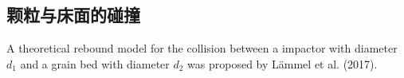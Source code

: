 \documentclass[12pt,a4paper]{article}
\newcommand{\diff}{\mathrm{d}} %
\newcommand{\pdiff}{\partial} %
\begin{document}
\subsection{颗粒与床面的碰撞}
A theoretical rebound model for the collision between a impactor with diameter $d_1$ and a grain bed with diameter $d_2$ was proposed by L\"ammel et al. (2017).
%
%
%
\end{document}

